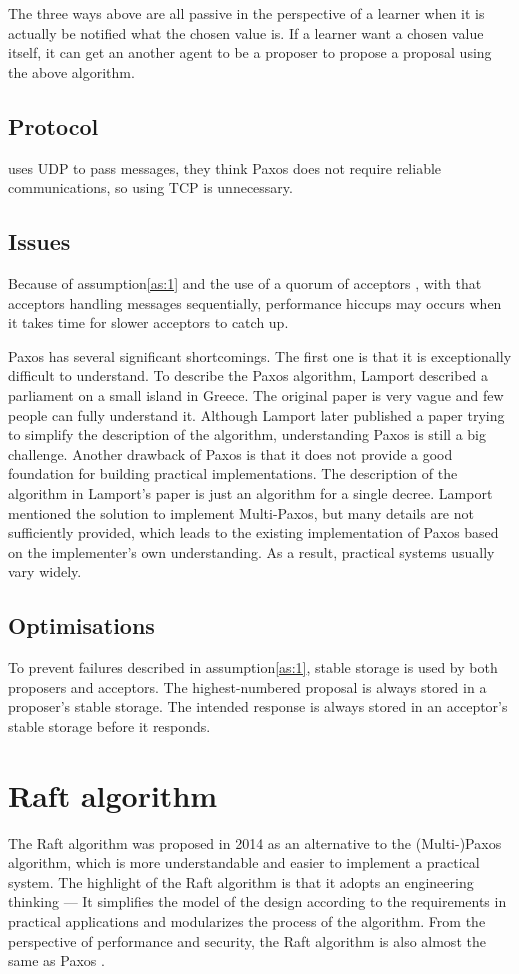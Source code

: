 \documentclass[12pt, a4paper]{article}
\begin{document}
The three ways above are all passive in the perspective of a learner when
it is actually be notified what the chosen value is.
If a learner want a chosen value itself,
it can get an another agent to be  a proposer
to propose a proposal using the above algorithm.
\subsection{Protocol}
\cite{PaxosMadeSwitch-y} uses UDP to pass messages,
they think Paxos does not require reliable communications,
so using TCP is unnecessary.
\subsection{Issues}
Because of assumption\ref{as:1} and
the use of a quorum of acceptors \cite{jalili2014practical},
with that acceptors handling messages sequentially,
performance hiccups may occurs when it takes time for slower acceptors
to catch up.


Paxos has several significant shortcomings. The first one is that it
is exceptionally difficult to understand\cite{conf/usenix/OngaroO14}.
To describe the Paxos algorithm, Lamport described a parliament on a
small island in Greece\cite{lamport1998part}. The original paper is
very vague and few people can fully understand it. Although Lamport
later published a paper trying to simplify the description of the
algorithm\cite{lamport2001paxos}, understanding Paxos is still a big
challenge. Another drawback of Paxos is that it does not provide a
good foundation for building practical implementations\cite{conf/usenix/OngaroO14}.
The description of the algorithm in Lamport's paper is just an
algorithm for a single decree. Lamport mentioned the solution to
implement Multi-Paxos, but many details are not sufficiently provided,
which leads to the existing implementation of Paxos based on the
implementer's own understanding. As a result, practical systems usually
vary widely.

\subsection{Optimisations}
To prevent failures described in assumption\ref{as:1},
stable storage is used by both proposers and acceptors.
The highest-numbered proposal is always stored in a proposer's stable storage.
The intended response is always stored in an acceptor's stable storage
before it responds.

\section{Raft algorithm} \label{sec:raft}
The Raft algorithm was proposed in 2014\cite{conf/usenix/OngaroO14} as an alternative to the (Multi-)Paxos algorithm, which is more
understandable and easier to implement a practical system. The highlight of the Raft algorithm is that it adopts an
engineering thinking --- It simplifies the model of the design according to the requirements in practical applications and
modularizes the process of the algorithm. From the perspective of performance and security, the Raft algorithm is also almost
the same as Paxos \cite{conf/usenix/OngaroO14}.
\end{document}
